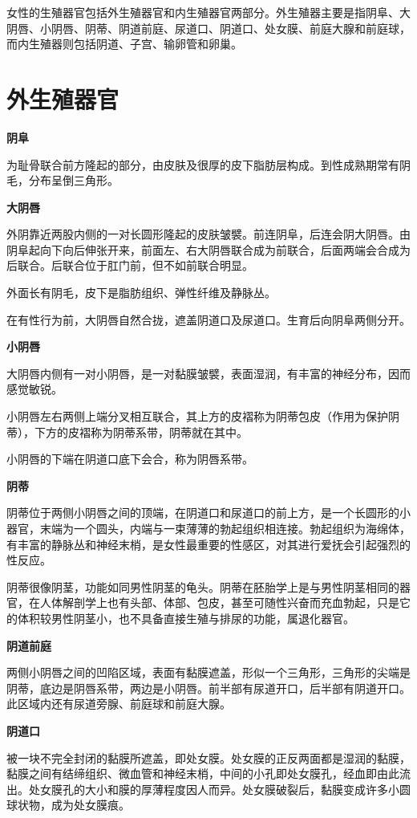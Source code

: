 \documentclass[12pt,UTF8]{ctexbook}
\begin{document}
女性的生殖器官包括外生殖器官和内生殖器官两部分。外生殖器主要是指阴阜、大阴唇、小阴唇、阴蒂、阴道前庭、尿道口、阴道口、处女膜、前庭大腺和前庭球，而内生殖器则包括阴道、子宫、输卵管和卵巢。

\section{外生殖器官}

\textbf{阴阜}

为耻骨联合前方隆起的部分，由皮肤及很厚的皮下脂肪层构成。到性成熟期常有阴毛，分布呈倒三角形。

\textbf{大阴唇}

外阴靠近两股内侧的一对长圆形隆起的皮肤皱襞。前连阴阜，后连会阴大阴唇。由阴阜起向下向后伸张开来，前面左、右大阴唇联合成为前联合，后面两端会合成为后联合。后联合位于肛门前，但不如前联合明显。

外面长有阴毛，皮下是脂肪组织、弹性纤维及静脉丛。

在有性行为前，大阴唇自然合拢，遮盖阴道口及尿道口。生育后向阴阜两侧分开。

\textbf{小阴唇}

大阴唇内侧有一对小阴唇，是一对黏膜皱襞，表面湿润，有丰富的神经分布，因而感觉敏锐。

小阴唇左右两侧上端分叉相互联合，其上方的皮褶称为阴蒂包皮（作用为保护阴蒂），下方的皮褶称为阴蒂系带，阴蒂就在其中。

小阴唇的下端在阴道口底下会合，称为阴唇系带。

\textbf{阴蒂}

阴蒂位于两侧小阴唇之间的顶端，在阴道口和尿道口的前上方，是一个长圆形的小器官，末端为一个圆头，内端与一束薄薄的勃起组织相连接。勃起组织为海绵体，有丰富的静脉丛和神经末梢，是女性最重要的性感区，对其进行爱抚会引起强烈的性反应。

阴蒂很像阴茎，功能如同男性阴茎的龟头。阴蒂在胚胎学上是与男性阴茎相同的器官，在人体解剖学上也有头部、体部、包皮，甚至可随性兴奋而充血勃起，只是它的体积较男性阴茎小，也不具备直接生殖与排尿的功能，属退化器官。

\textbf{阴道前庭}

两侧小阴唇之间的凹陷区域，表面有黏膜遮盖，形似一个三角形，三角形的尖端是阴蒂，底边是阴唇系带，两边是小阴唇。前半部有尿道开口，后半部有阴道开口。此区域内还有尿道旁腺、前庭球和前庭大腺。

\textbf{阴道口}

被一块不完全封闭的黏膜所遮盖，即处女膜。处女膜的正反两面都是湿润的黏膜，黏膜之间有结缔组织、微血管和神经末梢，中间的小孔即处女膜孔，经血即由此流出。处女膜孔的大小和膜的厚薄程度因人而异。处女膜破裂后，黏膜变成许多小圆球状物，成为处女膜痕。
\end{document}
